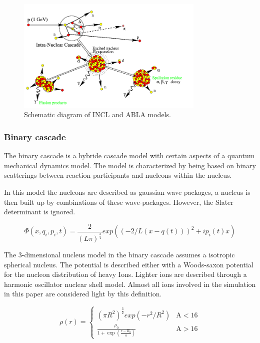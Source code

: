 \begin{figure} 
\begin{center}
\includegraphics[width=0.8\textwidth]{images/inclScematic.png}  
\caption{\label{fig:inclschematic} Schematic diagram of INCL and ABLA models.}
 
 \end{center}
 \end{figure}

\subsubsection{Binary cascade}
The binary cascade is a hybride cascade model with certain aspects of a quantum mechanical dynamics model. The model is characterized by being based on binary scatterings between reaction participants and nucleons within the nucleus.

In this model the nucleons are described as gaussian wave packages, a nucleus is then built up by combinations of these wave-packages. However, the Slater determinant is ignored.


\begin{equation}
\Phi(x,q_i,p_i,t) = \frac{2}{(L\pi)^{\frac{3}{4}}}exp((-2/L(x -q(t)))^2+ip_i(t)x)
\label{wavePackage}
\end{equation}


The 3-dimensional nucleus model in the binary cascade assumes a isotropic spherical nucleus. The potential is described either with a Woods-saxon potential for the nucleon distribution of heavy Ions. Lighter ions are described through a harmonic oscillator nuclear shell model. Almost all ions involved in the simulation in this paper are considered light by this definition.

\begin{equation}
\rho(r) = \begin{cases}
(\pi R^2)^{\frac{3}{2}}exp(-r^2/R^2) & \text{A}<16 \\
\frac{\rho_{0}}{1+\exp({\frac{r-R_{0}}{a}})} & \text{A}>16
\end{cases}
\label{binaryCascadePotential}
\end{equation}

